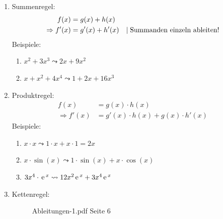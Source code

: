 \begin{enumerate}
    \item Summenregel:
    \begin{align}
        f(x) &= g(x) + h(x)\\
        \Rightarrow f'(x) &= g'(x) + h'(x) \mcomm \text{Summanden einzeln ableiten!}
    \end{align}
    Beispiele:
    \begin{enumerate}
        \item \(x^2 + 3x^3 \leadsto 2x + 9x^2\)
        \item \(x + x^2 + 4x^4 \leadsto 1 + 2x + 16x^3\)
    \end{enumerate}
    \item Produktregel:
    \begin{align}
        f(x) &= g(x) \cdot h(x)\\
        \Rightarrow f'(x) &= g'(x) \cdot h(x) + g(x) \cdot h'(x)
    \end{align}
    Beispiele:
    \begin{enumerate}
        \item \(x \cdot x \leadsto 1 \cdot x + x \cdot 1 = 2x \)
        \item \(x \cdot \sin(x) \leadsto 1 \cdot \sin(x) + x \cdot \cos(x)\)
        \item \(3x^4 \cdot {\,\mathrm e\,}^x \leadsto 12x^2{\,\mathrm e\,}^x + 3x^4{\,\mathrm e\,}^x\)
    \end{enumerate}
    \item Kettenregel:
    \begin{figure}[H]
        \centering
        \label{figEmpty}
        \caption{Ableitungen-1.pdf Seite 6}
    \end{figure}
\end{enumerate}



